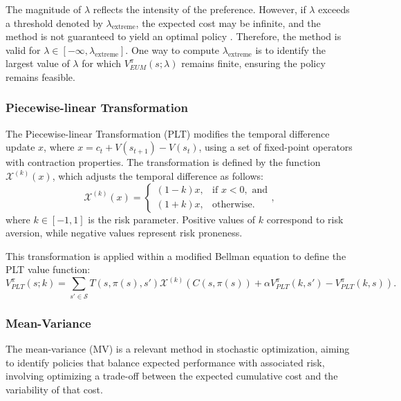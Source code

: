\documentclass[runningheads]{llncs}
\begin{document}
The magnitude of $\lambda$ reflects the intensity of the preference. However, if $\lambda$ exceeds a threshold denoted by $\lambda_{\text{extreme}}$, the expected cost may be infinite, and the method is not guaranteed to yield an optimal policy \cite{freire2016extreme}. Therefore, the method is valid for $\lambda \in [-\infty, \lambda_{\text{extreme}}]$. One way to compute $\lambda_{\text{extreme}}$ is to identify the largest value of $\lambda$ for which $V^\pi_{EUM}(s; \lambda)$ remains finite, ensuring the policy remains feasible.

\subsubsection{Piecewise-linear Transformation}
The Piecewise-linear Transformation (PLT) \cite{mihatsch2002risk,piecewise-linear} modifies the temporal difference update $x$, where $x = c_{t} + V(s_{t+1}) - V(s_{t})$, using a set of fixed-point operators with contraction properties. The transformation is defined by the function $\mathcal{X}^{(k)}(x)$, which adjusts the temporal difference as follows:
\begin{equation}
    \mathcal{X}^{(k)}(x) = 
    \left\{ \begin{array}{rcl}
    (1-k)x, & \mbox{if } x < 0, \mbox{ and} \\
    (1+k)x, & \mbox{otherwise.}
    \end{array}\right.,
\end{equation}
where $k \in [-1, 1]$ is the risk parameter. Positive values of $k$ correspond to risk aversion, while negative values represent risk proneness.

This transformation is applied within a modified Bellman equation to define the PLT value function:
\begin{equation}
        V^\pi_{PLT}(s; k) = \sum_{s' \in \mathcal{S}}
        T(s,\pi(s),s') \mathcal{X}^{(k)}
        (C(s,\pi(s)) + \alpha V_{PLT}^\pi(k, s') - V_{PLT}^\pi(k, s)).
\end{equation}

\subsubsection{Mean-Variance} The mean-variance (MV) \cite{sobelmeanvariance} is a relevant method in stochastic optimization, aiming to identify policies that balance expected performance with associated risk, involving optimizing a trade-off between the expected cumulative cost and the variability of that cost.
\end{document}
